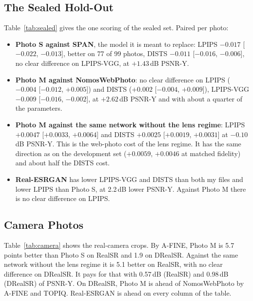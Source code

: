 \documentclass[conference]{IEEEtran}
\begin{document}
\subsection{The Sealed Hold-Out}
Table~\ref{tab:sealed} gives the one scoring of the sealed set. Paired per photo:
\begin{itemize}
\item \textbf{Photo S against SPAN}, the model it is meant to replace: LPIPS $-0.017$ [$-0.022$, $-0.013$], better on
  77 of 99 photos, DISTS $-0.011$ [$-0.016$, $-0.006$], no clear difference on LPIPS-VGG, at $+1.43$\,dB PSNR-Y.
\item \textbf{Photo M against NomosWebPhoto}: no clear difference on LPIPS ($-0.004$ [$-0.012$, $+0.005$]) and DISTS
  ($+0.002$ [$-0.004$, $+0.009$]), LPIPS-VGG $-0.009$ [$-0.016$, $-0.002$], at $+2.62$\,dB PSNR-Y and with about a
  quarter of the parameters.
\item \textbf{Photo M against the same network without the lens regime}: LPIPS $+0.0047$ [$+0.0033$, $+0.0064$] and DISTS
  $+0.0025$ [$+0.0019$, $+0.0031$] at $-0.10$\,dB PSNR-Y. This is the web-photo cost of the lens regime. It has the
  same direction as on the development set ($+0.0059$, $+0.0046$ at matched fidelity) and about half the DISTS cost.
\item \textbf{Real-ESRGAN} has lower LPIPS-VGG and DISTS than both my files and lower LPIPS than Photo S, at 2.2\,dB
  lower PSNR-Y. Against Photo M there is no clear difference on LPIPS.
\end{itemize}

\subsection{Camera Photos}
Table~\ref{tab:camera} shows the real-camera crops. By A-FINE, Photo M is 5.7 points better than Photo S on RealSR and 1.9
on DRealSR. Against the same network without the lens regime it is 5.1 better on RealSR, with no clear difference on
DRealSR. It pays for that with 0.57\,dB (RealSR) and 0.98\,dB (DRealSR) of PSNR-Y. On DRealSR, Photo M is ahead of
NomosWebPhoto by A-FINE and TOPIQ. Real-ESRGAN is ahead on every column of the table.
\end{document}
